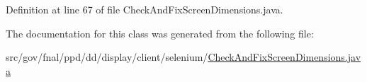 Definition at line 67 of file Check\-And\-Fix\-Screen\-Dimensions.\-java.



The documentation for this class was generated from the following file\-:\begin{DoxyCompactItemize}
\item 
src/gov/fnal/ppd/dd/display/client/selenium/\hyperlink{CheckAndFixScreenDimensions_8java}{Check\-And\-Fix\-Screen\-Dimensions.\-java}\end{DoxyCompactItemize}
